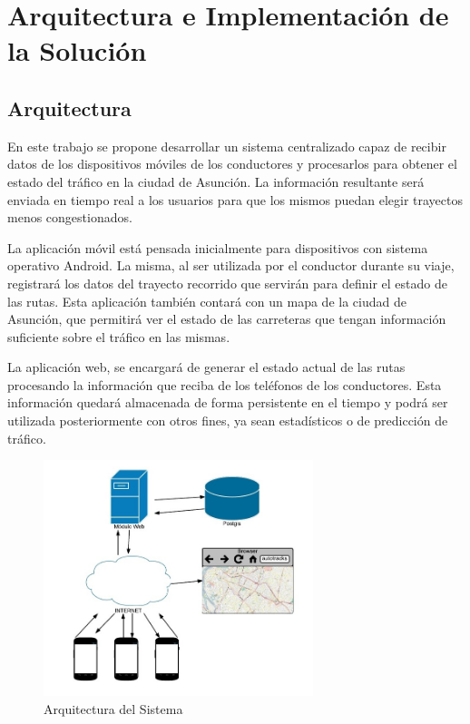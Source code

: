 \chapter{Arquitectura e Implementación de la Solución}

\section{Arquitectura}

En este trabajo se propone desarrollar un sistema centralizado capaz de recibir datos de los dispositivos móviles de los conductores y procesarlos para obtener el estado del tráfico en la ciudad de Asunción. La información resultante será enviada en tiempo real a los usuarios para que los mismos puedan elegir trayectos menos congestionados.

La aplicación móvil está pensada inicialmente para dispositivos con sistema operativo Android. La misma, al ser utilizada por el conductor durante su viaje, registrará los datos del trayecto recorrido que servirán para definir el estado de las rutas. Esta aplicación también contará con un mapa de la ciudad de Asunción, que permitirá ver el estado de las carreteras que tengan información suficiente sobre el tráfico en las mismas. 

La aplicación web, se encargará de generar el estado actual de las rutas procesando la información que reciba de los teléfonos de los conductores. Esta información quedará almacenada de forma persistente en el tiempo  y podrá ser utilizada posteriormente con otros fines, ya sean estadísticos o de predicción de tráfico.

\begin{figure}[h]
	\centering
	\includegraphics[width=0.7\textwidth]{capitulos/6/figuras/figura1.jpg}
	\caption{\label{fig:arquitectura} Arquitectura del Sistema}	
\end{figure}

